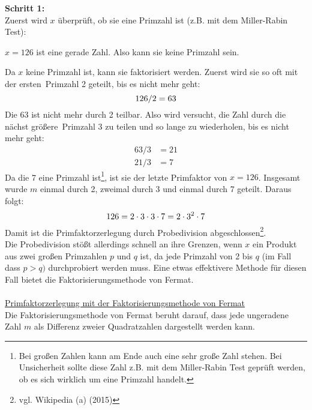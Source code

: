 \textbf{Schritt 1:} \\
Zuerst wird $x$ überprüft, ob sie eine Primzahl ist (z.B. mit dem Miller-Rabin Test):
\begin{center}
$x=126$ ist eine gerade Zahl. Also kann sie keine Primzahl sein.
\end{center}
Da $x$ keine Primzahl ist, kann sie faktorisiert werden. Zuerst wird sie so oft mit der \glqq ersten\grqq~Primzahl 2 geteilt, bis es nicht mehr geht:
\begin{equation*}
126/2=63\\
\end{equation*}
Die 63 ist nicht mehr durch 2 teilbar. Also wird versucht, die Zahl durch die \glqq nächst größere\grqq~Primzahl 3 zu teilen und so lange zu wiederholen, bis es nicht mehr geht:
\begin{align*}
63/3&=21\\
21/3&=7
\end{align*}
Da die 7 eine Primzahl ist\footnote{Bei großen Zahlen kann am Ende auch eine sehr große Zahl stehen. Bei Unsicherheit sollte diese Zahl z.B. mit dem Miller-Rabin Test geprüft werden, ob es sich wirklich um eine Primzahl handelt.}, ist sie der letzte Primfaktor von $x=126$. Insgesamt wurde $m$ einmal durch 2, zweimal durch 3 und einmal durch 7 geteilt. Daraus folgt:\\
\begin{equation*}
126=2\cdot3\cdot3\cdot7=2\cdot3^{2}\cdot7\\
\end{equation*}
Damit ist die Primfaktorzerlegung durch Probedivision abgeschlossen\footnote{vgl. Wikipedia (a) (2015)}.\\
Die Probedivision stößt allerdings schnell an ihre Grenzen, wenn $x$ ein Produkt aus zwei großen Primzahlen $p$ und $q$ ist, da jede Primzahl von 2 bis $q$ (im Fall dass $p>q)$ durchprobiert werden muss. Eine etwas effektivere Methode für diesen Fall bietet die Faktorisierungsmethode von Fermat.\\ 
\\
\underline{Primfaktorzerlegung mit der Faktorisierungsmethode von Fermat}\\
Die Faktorisierungsmethode von Fermat beruht darauf, dass jede ungeradene Zahl $m$ als Differenz zweier Quadratzahlen dargestellt werden kann.

